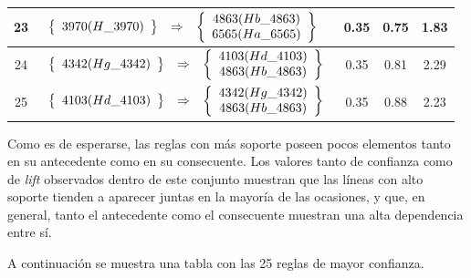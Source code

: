 \begin{longtable}{| c | l | c | c | c |}
23 & $\begin{array}{c c c}\left\{\begin{array}{c}3970 (H\_3970)\end{array}\right\} & \Rightarrow & \left\{\begin{array}{c}4863 (Hb\_4863) \\ 6565 (Ha\_6565)\end{array}\right\}\end{array}$ & 0.35 & 0.75 & 1.83 \\ \hline
24 & $\begin{array}{c c c}\left\{\begin{array}{c}4342 (Hg\_4342)\end{array}\right\} & \Rightarrow & \left\{\begin{array}{c}4103 (Hd\_4103) \\ 4863 (Hb\_4863)\end{array}\right\}\end{array}$ & 0.35 & 0.81 & 2.29 \\ \hline
25 & $\begin{array}{c c c}\left\{\begin{array}{c}4103 (Hd\_4103)\end{array}\right\} & \Rightarrow & \left\{\begin{array}{c}4342 (Hg\_4342) \\ 4863 (Hb\_4863)\end{array}\right\}\end{array}$ & 0.35 & 0.88 & 2.23 \\ \hline
\end{longtable}

Como es de esperarse, las reglas con más soporte poseen pocos elementos tanto en su antecedente como en su consecuente. Los valores tanto de confianza como de \textit{lift} observados dentro de este conjunto muestran que las líneas con alto soporte tienden a aparecer juntas en la mayoría de las ocasiones, y que, en general, tanto el antecedente como el consecuente muestran una alta dependencia entre sí.

A continuación se muestra una tabla con las 25 reglas de mayor confianza.

